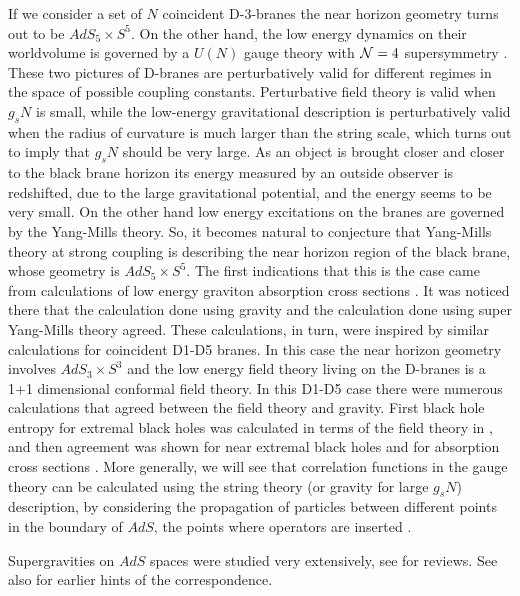 If we consider a set of $N$ coincident 
D-3-branes the near horizon geometry turns out to be
$AdS_5\times S^5$. On the other hand, the low energy 
dynamics on their worldvolume is governed by a $U(N)$ gauge theory
with ${\cal N} =4$ supersymmetry \cite{Witten:1996im}. 
These two pictures of D-branes are perturbatively valid for
different regimes in the space of possible coupling constants. Perturbative
field theory is valid when $g_s N$ is small, 
while the low-energy gravitational description is perturbatively 
valid when
the radius of curvature is much larger than the string scale,
which turns out to imply that $g_s N$ should be very large. 
As an object is brought closer and closer to the 
 black brane  horizon
its energy measured by an outside observer is redshifted, due to the
large gravitational potential, and the energy seems to be very small. 
On the other hand low energy excitations on the branes are governed
by the Yang-Mills theory. So, it becomes natural to conjecture that 
Yang-Mills theory at strong coupling is describing
the near horizon region of the black brane, whose geometry
is $AdS_5\times S^5$.
The first indications that this is the case came from calculations
of low energy graviton absorption cross sections 
\cite{Klebanov:1997kc,Gubser:1997yh,Gubser:1997se}. It was
noticed there that the calculation done using gravity and the 
calculation done using super Yang-Mills theory agreed. 
These calculations, in turn, were inspired by similar calculations
 for coincident D1-D5 branes. In this case the
near horizon geometry involves $AdS_3\times S^3$ and the low energy
field theory living on the D-branes is a 1+1 dimensional conformal
field theory.
In this D1-D5 case 
there were numerous calculations that agreed between the field theory
and gravity. First black hole entropy for extremal black holes was
calculated in terms of the field theory in \cite{Strominger:1996sh},
and then 
agreement was shown for near extremal black holes 
\cite{Callan:1996dv,Horowitz:1996fn} and
for absorption cross sections 
\cite{Das:1996wn,Dhar:1996vu,Maldacena:1997ix}. 
More generally, we will see that
correlation functions in the gauge theory can be calculated 
using the string theory (or gravity for large $g_s N$)
description, by considering the propagation
of particles between different points in the boundary of $AdS$, 
the points where operators are inserted 
\cite{Gubser:1998bc,Witten:1998qj}. 

Supergravities on $AdS$ spaces  were 
 studied very  extensively,
see 
\cite{Salam:1989fm,Duff:1986hr} for reviews. See also
\cite{Boonstra:1997dy,Sfetsos:1998xs} for earlier hints of the
 correspondence.
 

